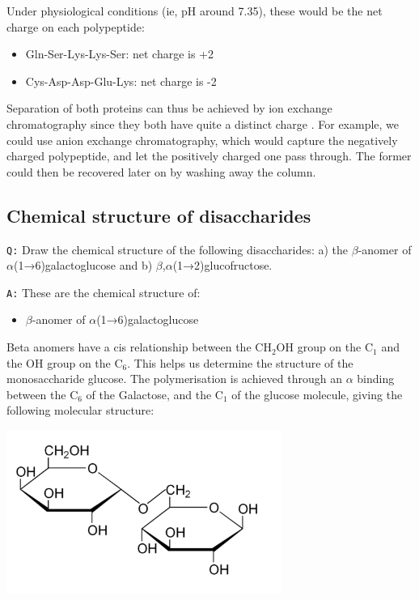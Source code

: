 \documentclass[11pt, a4paper,titlepage]{article}
\begin{document}
Under physiological conditions (ie, pH around 7.35), these would be
the net charge on each polypeptide:

\begin{itemize}
\item Gln-Ser-Lys-Lys-Ser: net charge is +2

\item Cys-Asp-Asp-Glu-Lys: net charge is -2

\end{itemize}

Separation of both proteins can thus be achieved by ion exchange
chromatography since they both have quite a distinct charge
\cite{BioChemPrinciples}. For example, we could use anion exchange
chromatography, which would capture the negatively charged
polypeptide, and let the positively charged one pass through. The
former could then be recovered later on by washing away the column.
\subsection{Chemical structure of disaccharides}
\label{sec-2-3}

\texttt{Q:} Draw the chemical structure of the following disaccharides: a)
the $\beta$-anomer of $\alpha$(1→6)galactoglucose and b)
$\beta$,$\alpha$(1→2)glucofructose.

\texttt{A:} These are the chemical structure of:
\begin{itemize}
\item $\beta$-anomer of $\alpha$(1→6)galactoglucose
\end{itemize}

Beta anomers have a cis relationship between the CH$_{2}$OH group on the
C$_{1}$ and the OH group on the C$_{6}$. This helps us determine the
structure of the monosaccharide glucose. The polymerisation is
achieved through an $\alpha$ binding between the C$_{6}$ of the Galactose,
and the C$_{1}$ of the glucose molecule, giving the following molecular
structure:

\includegraphics[width=9cm]{./Figures/B-A(1-6)GalactoGlucose.pdf}
\end{document}
